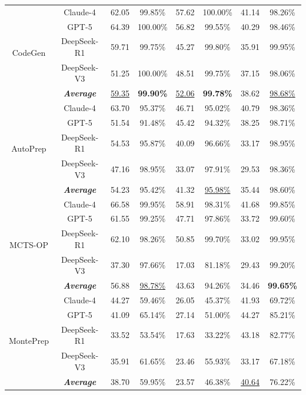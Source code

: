 \begin{table}[t]
{\begin{tabular}{|c|c||c|c|c|c|c|c|}
      \multirow{5}{*}{CodeGen} 
      & Claude-4 & 62.05 & 99.85\% & 57.62 & 100.00\% & 41.14 & 98.26\% \\
      & GPT-5 & 64.39 & 100.00\% & 56.82 & 99.55\% & 40.29 & 98.46\% \\
      & DeepSeek-R1 & 59.71 & 99.75\% & 45.27 & 99.80\% & 35.91 & 99.95\% \\
      & DeepSeek-V3 & 51.25 & 100.00\% & 48.51 & 99.75\% & 37.15 & 98.06\% \\ 
      \rowcolor{gray!15} \cellcolor{white} & \textbf{\textit{Average}} & \underline{59.35} & \textbf{99.90\%} & \underline{52.06} & \textbf{99.78\%} & 38.62 & \underline{98.68\%} \\ \hline

      \multirow{5}{*}{AutoPrep} 
      & Claude-4 & 63.70 & 95.37\% & 46.71 & 95.02\% & 40.79 & 98.36\% \\
      & GPT-5 & 51.54 & 91.48\% & 45.42 & 94.32\% & 38.25 & 98.71\% \\
      & DeepSeek-R1 & 54.53 & 95.87\% & 40.09 & 96.66\% & 33.17 & 98.95\% \\
      & DeepSeek-V3 & 47.16 & 98.95\% & 33.07 & 97.91\% & 29.53 & 98.36\% \\ 
      \rowcolor{gray!15} \cellcolor{white} & \textbf{\textit{Average}} & 54.23 & 95.42\% & 41.32 & \underline{95.98\%} & 35.44 & 98.60\% \\ \hline\hline

      \multirow{5}{*}{MCTS-OP} 
      & Claude-4 & 66.58 & 99.95\% & 58.91 & 98.31\% & 41.68 & 99.85\% \\
      & GPT-5 & 61.55 & 99.25\% & 47.71 & 97.86\% & 33.72 & 99.60\% \\
      & DeepSeek-R1 & 62.10 & 98.26\% & 50.85 & 99.70\% & 33.02 & 99.95\% \\
      & DeepSeek-V3 & 37.30 & 97.66\% & 17.03 & 81.18\% & 29.43 & 99.20\% \\ 
      \rowcolor{gray!15} \cellcolor{white} & \textbf{\textit{Average}} & 56.88 & \underline{98.78\%} & 43.63 & 94.26\% & 34.46 & \textbf{99.65\%} \\ \hline

      \multirow{5}{*}{MontePrep} 
      & Claude-4 & 44.27 & 59.46\% & 26.05 & 45.37\% & 41.93 & 69.72\% \\
      & GPT-5 & 41.09 & 65.14\% & 27.14 & 51.00\% & 44.27 & 85.21\% \\
      & DeepSeek-R1 & 33.52 & 53.54\% & 17.63 & 33.22\% & 43.18 & 82.77\% \\
      & DeepSeek-V3 & 35.91 & 61.65\% & 23.46 & 55.93\% & 33.17 & 67.18\% \\ 
      \rowcolor{gray!15} \cellcolor{white} & \textbf{\textit{Average}} & 38.70 & 59.95\% & 23.57 & 46.38\% & \underline{40.64} & 76.22\% \\ \hline\hline


\end{tabular}}
\end{table}
